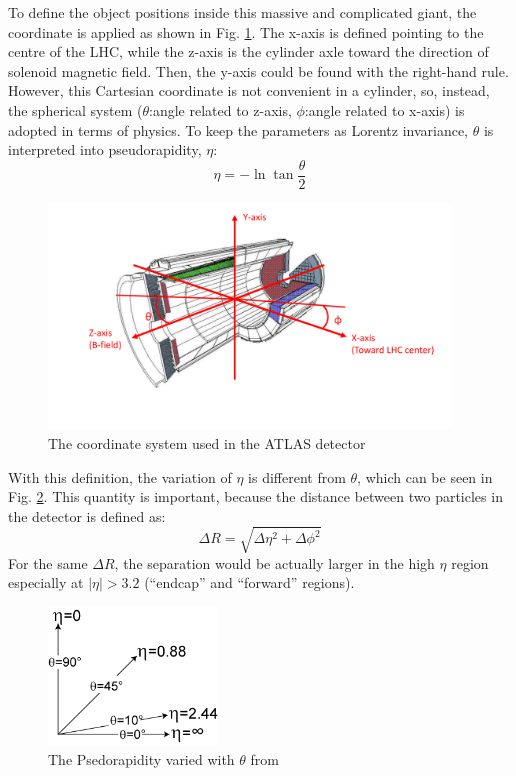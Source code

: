 To define the object positions inside this massive and complicated giant, the coordinate is applied as shown in Fig. \ref{Fig:coordinate}. The x-axis is defined pointing to the centre of the LHC, while the z-axis is the cylinder axle toward the direction of solenoid magnetic field. Then, the y-axis could be found with the right-hand rule. However, this Cartesian coordinate is not convenient in a cylinder, so, instead, the spherical system ($\theta$:angle related to z-axis, $\phi$:angle related to x-axis) is adopted in terms of physics. To keep the parameters as Lorentz invariance, $\theta$ is interpreted into pseudorapidity, $\eta$:
\begin{equation}
\eta = -\ln{\tan{\frac{\theta}{2}}}
\end{equation}
\begin{figure}[!h]                
	\includegraphics[width=0.95\textwidth]{Chapter2/coordinate}
	\centering
	\begin{center}
		\caption{The coordinate system used in the ATLAS detector}
		\label{Fig:coordinate}            
	\end{center}
\end{figure}
With this definition, the variation of $\eta$ is different from $\theta$, which can be seen in Fig. \ref{Fig:pseudorapidity}. This quantity is important, because the distance between two particles in the detector is defined as:
\begin{equation}
\Delta R= \sqrt{\Delta \eta^{2}+\Delta \phi^{2}}
\end{equation}
For the same $\Delta R$, the separation would be actually larger in the high $\eta$ region especially at $|\eta|>3.2$ (``endcap'' and ``forward'' regions).  
\begin{figure}[!h]                
	\includegraphics[width=0.4\textwidth]{Chapter2/pseudorapidity.png}
	\centering
	\begin{center}
		\caption{The Psedorapidity varied with $\theta$ from \cite{pseudorapidity_wiki}}
		\label{Fig:pseudorapidity}            
	\end{center}
\end{figure}

